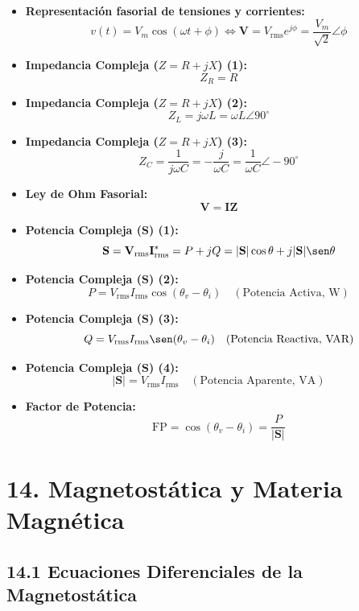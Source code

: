 \documentclass[11pt,a4paper]{article}
\begin{document}
\begin{itemize}
  \item \textbf{Representación fasorial de tensiones y corrientes:}
  \[
    v(t) = V_m \cos(\omega t + \phi) \iff \mathbf{V} = V_{\mathrm{rms}} e^{j\phi} = \frac{V_m}{\sqrt{2}} \angle \phi
  \]
  \item \textbf{Impedancia Compleja ($Z = R + jX$) (1):}
  \[
    Z_R = R
  \]
  \item \textbf{Impedancia Compleja ($Z = R + jX$) (2):}
  \[
    Z_L = j\omega L = \omega L \angle 90^\circ
  \]
  \item \textbf{Impedancia Compleja ($Z = R + jX$) (3):}
  \[
    Z_C = \frac{1}{j\omega C} = -\frac{j}{\omega C} = \frac{1}{\omega C} \angle -90^\circ
  \]
  \item \textbf{Ley de Ohm Fasorial:}
  \[
    \mathbf{V} = \mathbf{I} \mathbf{Z}
  \]
  \item \textbf{Potencia Compleja ($\mathbf{S}$) (1):}
  \[
    \mathbf{S} = \mathbf{V}_{\mathrm{rms}} \mathbf{I}_{\mathrm{rms}}^* = P + j Q = |\mathbf{S}| \cos\theta + j |\mathbf{S}| \sen\theta
  \]
  \item \textbf{Potencia Compleja ($\mathbf{S}$) (2):}
  \[
    P = V_{\mathrm{rms}} I_{\mathrm{rms}} \cos(\theta_v - \theta_i) \quad (\text{Potencia Activa, W})
  \]
  \item \textbf{Potencia Compleja ($\mathbf{S}$) (3):}
  \[
    Q = V_{\mathrm{rms}} I_{\mathrm{rms}} \sen(\theta_v - \theta_i) \quad (\text{Potencia Reactiva, VAR})
  \]
  \item \textbf{Potencia Compleja ($\mathbf{S}$) (4):}
  \[
    |\mathbf{S}| = V_{\mathrm{rms}} I_{\mathrm{rms}} \quad (\text{Potencia Aparente, VA})
  \]
  \item \textbf{Factor de Potencia:}
  \[
    \mathrm{FP} = \cos(\theta_v - \theta_i) = \frac{P}{|\mathbf{S}|}
  \]
\end{itemize}

\section*{14. Magnetostática y Materia Magnética}

\subsection*{14.1 Ecuaciones Diferenciales de la Magnetostática}
\end{document}
